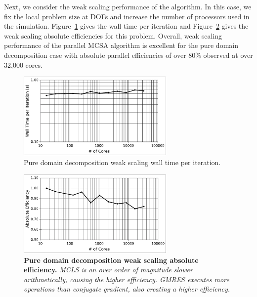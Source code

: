 \documentclass{snamc2013}
\begin{document}
Next, we consider the weak scaling performance of the algorithm. In
this case, we fix the local problem size at  DOFs and
increase the number of processors used in the
simulation. Figure~\ref{fig:titan_pure_weak_time} gives the wall time
per iteration and Figure~\ref{fig:titan_weak_absolute} gives the weak
scaling absolute efficiencies for this problem. Overall, weak scaling
performance of the parallel MCSA algorithm is excellent for the pure
domain decomposition case with absolute parallel efficiencies of over
80\% observed at over 32,000 cores.

\begin{figure}[p!]
  \begin{center}
    \includegraphics[width=3in]{titan_pure_weak_time.pdf}
  \end{center}
  \caption{Pure domain decomposition weak scaling wall time
      per iteration.}
  \label{fig:titan_pure_weak_time}
\end{figure}

\begin{figure}[h!]
  \begin{center}
    \includegraphics[width=3in]{titan_weak_absolute.pdf}
  \end{center}
  \caption{\textbf{Pure domain decomposition weak scaling absolute
      efficiency.} \textit{MCLS is an over order of magnitude slower
      arithmetically, causing the higher efficiency. GMRES executes
      more operations than conjugate gradient, also creating a higher
      efficiency.}}
  \label{fig:titan_weak_absolute}
\end{figure}
\end{document}
